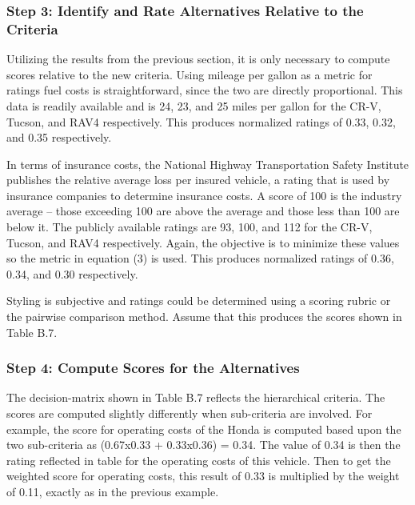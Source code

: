 \subsubsection*{Step 3: Identify and Rate Alternatives Relative to the
Criteria}\label{step-3-identify-and-rate-alternatives-relative-to-the-criteria-1}

Utilizing the results from the previous section, it is only necessary to
compute scores relative to the new criteria. Using mileage per gallon as
a metric for ratings fuel costs is straightforward, since the two are
directly proportional. This data is readily available and is 24, 23, and
25 miles per gallon for the CR-V, Tucson, and RAV4 respectively. This
produces normalized ratings of 0.33, 0.32, and 0.35 respectively.

In terms of insurance costs, the National Highway Transportation Safety
Institute publishes the relative average loss per insured vehicle, a
rating that is used by insurance companies to determine insurance costs.
A score of 100 is the industry average -- those exceeding 100 are above
the average and those less than 100 are below it. The publicly available
ratings are 93, 100, and 112 for the CR-V, Tucson, and RAV4
respectively. Again, the objective is to minimize these values so the
metric in equation (3) is used. This produces normalized ratings of
0.36, 0.34, and 0.30 respectively.

Styling is subjective and ratings could be determined using a scoring
rubric or the pairwise comparison method. Assume that this produces the
scores shown in Table B.7.

\subsubsection*{Step 4: Compute Scores for the
Alternatives}\label{step-4-compute-scores-for-the-alternatives-1}

The decision-matrix shown in Table B.7 reflects the hierarchical
criteria. The scores are computed slightly differently when sub-criteria
are involved. For example, the score for operating costs of the Honda is
computed based upon the two sub-criteria as (0.67x0.33 + 0.33x0.36) =
0.34. The value of 0.34 is then the rating reflected in table for the
operating costs of this vehicle. Then to get the weighted score for
operating costs, this result of 0.33 is multiplied by the weight of
0.11, exactly as in the previous example.

